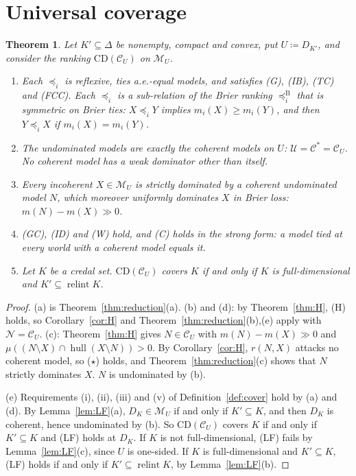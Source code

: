 \documentclass[11pt]{article}
\newcommand{\M}{\mathcal{M}}
\newcommand{\CC}{\mathcal{C}}
\newcommand{\UU}{\mathcal{U}}
\newcommand{\NN}{\mathcal{N}}
\newcommand{\CD}{\mathrm{CD}}
\newcommand{\hull}{\operatorname{hull}}
\DeclareMathOperator{\relint}{relint}
\theoremstyle{plain}
\newtheorem{theorem}{Theorem}[section]
\theoremstyle{definition}
\theoremstyle{remark}
\begin{document}
\section{Universal coverage}\label{sec:main}

\begin{theorem}\label{thm:main}
Let $K'\subseteq\Delta$ be nonempty, compact and convex, put $U\coloneqq
D_{K'}$, and consider the ranking $\CD(\CC_U)$ on $\M_U$.
\begin{enumerate}[label=(\alph*)]
  \item Each $\preceq_i$ is reflexive, ties a.e.-equal models, and satisfies (G), (IB),
  (TC) and (FCC). Each $\preceq_i$ is a sub-relation of the Brier ranking
  $\preceq^{\mathrm B}_i$ that is symmetric on Brier ties: $X\preceq_iY$ implies
  $m_i(X)\ge m_i(Y)$, and then $Y\preceq_iX$ if $m_i(X)=m_i(Y)$.
  \item The undominated models are exactly the coherent models on $U$:
  $\UU=\CC^\ast=\CC_U$. No coherent model has a weak dominator other than itself.
  \item Every incoherent $X\in\M_U$ is strictly dominated by a coherent undominated model
  $N$, which moreover uniformly dominates $X$ in Brier loss: $m(N)-m(X)\gg0$.
  \item (GC), (ID) and (W) hold, and (C) holds in the strong form: a model tied at every
  world with a coherent model equals it.
  \item Let $K$ be a credal set. $\CD(\CC_U)$ covers $K$ if and only if $K$ is
  full-dimensional and $K'\subseteq\relint K$.
\end{enumerate}
\end{theorem}

\begin{proof}
(a) is Theorem~\ref{thm:reduction}(a). (b) and (d): by Theorem~\ref{thm:H}, (H) holds,
so Corollary~\ref{cor:H} and Theorem~\ref{thm:reduction}(b),(e) apply with $\NN=\CC_U$.
(c): Theorem~\ref{thm:H} gives $N\in\CC_U$ with $m(N)-m(X)\gg0$ and $\mu((N\setminus X)
\cap\hull(X\setminus N))>0$. By Corollary~\ref{cor:H}, $r(N,X)$ attacks no coherent
model, so ($\star$) holds, and Theorem~\ref{thm:reduction}(c) shows that $N$ strictly
dominates $X$. $N$ is undominated by (b).

(e) Requirements (i), (ii), (iii) and (v) of Definition~\ref{def:cover} hold by (a) and
(d). By Lemma~\ref{lem:LF}(a), $D_K\in\M_U$ if and only if $K'\subseteq K$, and then
$D_K$ is coherent, hence undominated by (b). So $\CD(\CC_U)$ covers $K$ if and only if
$K'\subseteq K$ and (LF) holds at $D_K$. If $K$ is not full-dimensional, (LF) fails by
Lemma~\ref{lem:LF}(c), since $U$ is one-sided. If $K$ is full-dimensional and
$K'\subseteq K$, (LF) holds if and only if $K'\subseteq\relint K$, by
Lemma~\ref{lem:LF}(b).
\end{proof}
\end{document}
